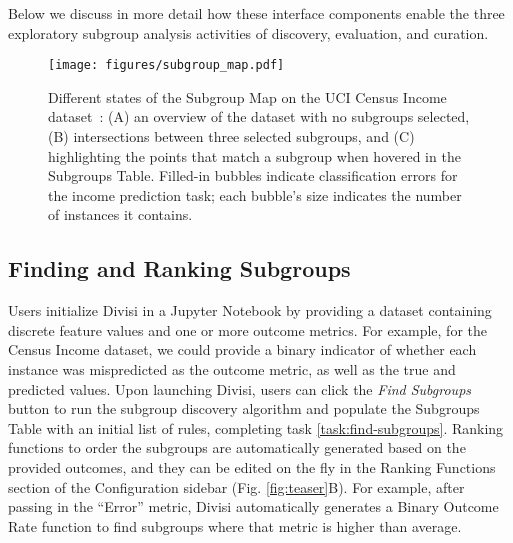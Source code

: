 Below we discuss in more detail how these interface components enable the three exploratory subgroup analysis activities of discovery, evaluation, and curation.

\begin{figure*}
    \centering
    \texttt{[image: figures/subgroup\_map.pdf]}
    \caption{Different states of the Subgroup Map on the UCI Census Income dataset~\cite{adult_2}: (A) an overview of the dataset with no subgroups selected, (B) intersections between three selected subgroups, and (C) highlighting the points that match a subgroup when hovered in the Subgroups Table. Filled-in bubbles indicate classification errors for the income prediction task; each bubble's size indicates the number of instances it contains.}
    \label{fig:subgroup-map}
\end{figure*}

\subsection{Finding and Ranking Subgroups}
\label{sec:vis-discovery}

Users initialize Divisi in a Jupyter Notebook by providing a dataset containing discrete feature values and one or more outcome metrics. 
For example, for the Census Income dataset, we could provide a binary indicator of whether each instance was mispredicted as the outcome metric, as well as the true and predicted values.
Upon launching Divisi, users can click the \textit{Find Subgroups} button to run the subgroup discovery algorithm and populate the Subgroups Table with an initial list of rules, completing task \ref{task:find-subgroups}.
Ranking functions to order the subgroups are automatically generated based on the provided outcomes, and they can be edited on the fly in the Ranking Functions section of the Configuration sidebar (Fig. \ref{fig:teaser}B).
For example, after passing in the ``Error'' metric, Divisi automatically generates a Binary Outcome Rate function to find subgroups where that metric is higher than average.


